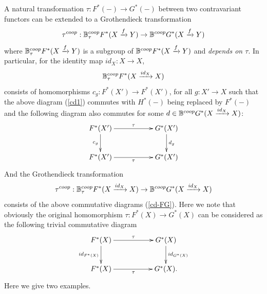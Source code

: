 \documentclass[a4paper]{amsart}
\begin{document}
A natural transformation $\tau: F^*(-) \to G^*(-)$ between two contravariant functors can be extended to a Grothendieck transformation
$$\tau^{coop}: \mathbb B^{coop}_{\tau}F^*(X \xrightarrow f Y) \to \mathbb B^{coop}G^*(X \xrightarrow f Y)$$
where $\mathbb B^{coop}_{\tau}F^*(X \xrightarrow f Y)$ is a subgroup of $\mathbb B^{coop}F^*(X \xrightarrow f Y)$
and \emph{depends on $\tau$}. 
In particular, for the identity map $id_X:X \to X$, 
$$\mathbb B^{coop}_{\tau}F^*(X \xrightarrow {id_X} X)$$
consists of homomorphisms $c_g:F^*(X') \to F^*(X')$, for all $g:X' \to X$ such that the above diagram (\ref{cd1}) commutes with $H^*(-)$ being replaced by $F^*(-)$ and the following diagram also commutes for some $d \in \mathbb B^{coop}G^*(X \xrightarrow {id_X} X)$:
\begin{equation}\label{cd-FG}
\xymatrix
{ F^*(X') \ar[d]_{c_g } \ar[rr]^{\tau} && G^*(X') \ar[d]^{d_g}  \\
F^*(X') \ar[rr]_{\tau} && G^*(X') \\
}
\end{equation}
And the Grothendieck transformation
$$\tau^{coop}: \mathbb B^{coop}_{\tau}F^*(X \xrightarrow {id_X} X) \to \mathbb B^{coop}G^*(X \xrightarrow {id_X} X)$$
consists of the above commutative diagrams (\ref{cd-FG}). Here we note that obviously the original homomorphism $\tau: F^*(X) \to G^*(X)$ can be considered as the following trivial commutative diagram 
\begin{equation*}%
\xymatrix
{ F^*(X) \ar[d]_{id_{F^*(X)}} \ar[rr]^{\tau} && G^*(X) \ar[d]^{id_{G^*(X)}}  \\
F^*(X) \ar[rr]_{\tau} && G^*(X). \\
}
\end{equation*}
Here we give two examples.
\end{document}
